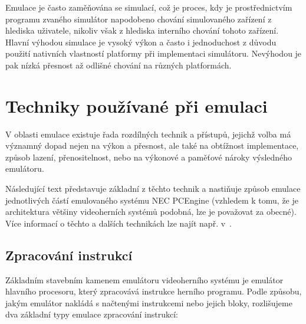 Emulace je často zaměňována se simulací, což je proces, kdy je prostřednictvím
programu zvaného simulátor napodobeno chování simulovaného zařízení z hlediska
uživatele, nikoliv však z hlediska interního chování tohoto zařízení. Hlavní
výhodou simulace je vysoký výkon a často i jednoduchost z důvodu použití
nativních vlastností platformy při implementaci simulátoru. Nevýhodou je pak
nízká přesnost až odlišné chování na různých platformách.


\section{Techniky používané při emulaci}\label{chap:anal_techniques}

V oblasti emulace existuje řada rozdílných technik a přístupů, jejichž volba má
významný dopad nejen na výkon a přesnost, ale také na obtížnost implementace,
způsob lazení, přenositelnost, nebo na výkonové a paměťové nároky výsledného
emulátoru.

Následující text představuje základní z těchto technik a nastiňuje způsob
emulace jednotlivých částí emulovaného systému NEC PCEngine (vzhledem k tomu,
že je architektura většiny videoherních systémů podobná, lze je považovat za
obecné). Více informací o těchto a dalších technikách lze najít např.
v~\cite{Barrio01, Boris99}.


\subsection{Zpracování instrukcí}

Základním stavebním kamenem emulátoru videoherního systému je emulátor hlavního
procesoru, který zpracovává instrukce herního programu. Podle způsobu, jakým
emulátor nakládá s načtenými instrukcemi nebo jejich bloky, rozlišujeme dva
základní typy emulace zpracování instrukcí:

